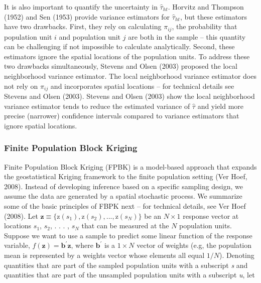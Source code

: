 \documentclass[]{elsarticle} %
\begin{document}
It is also important to quantify the uncertainty in \(\hat{\tau}_{ht}\).
Horvitz and Thompson (1952) and Sen (1953) provide variance estimators
for \(\hat{\tau}_{ht}\), but these estimators have two drawbacks. First,
they rely on calculating \(\pi_{ij}\), the probability that population
unit \(i\) and population unit \(j\) are both in the sample -- this
quantity can be challenging if not impossible to calculate analytically.
Second, these estimators ignore the spatial locations of the population
units. To address these two drawbacks simultaneously, Stevens and Olsen
(2003) proposed the local neighborhood variance estimator. The local
neighborhood variance estimator does not rely on \(\pi_{ij}\) and
incorporates spatial locations -- for technical details see Stevens and
Olsen (2003). Stevens and Olsen (2003) show the local neighborhood
variance estimator tends to reduce the estimated variance of
\(\hat{\tau}\) and yield more precise (narrower) confidence intervals
compared to variance estimators that ignore spatial locations.

\hypertarget{finite-population-block-kriging}{%
\subsubsection{Finite Population Block
Kriging}\label{finite-population-block-kriging}}

Finite Population Block Kriging (FPBK) is a model-based approach that
expands the geostatistical Kriging framework to the finite population
setting (Ver Hoef, 2008). Instead of developing inference based on a
specific sampling design, we assume the data are generated by a spatial
stochastic process. We summarize some of the basic principles of FBPK
next -- for technical details, see Ver Hoef (2008). Let
\({\mathbf{z} \equiv \{\text{z}(s_1), \text{z}(s_2), . . . , \text{z}(s_N) \}}\)
be an \(N \times 1\) response vector at locations \(s_1\), \(s_2\), . .
. , \(s_N\) that can be measured at the \(N\) population units. Suppose
we want to use a sample to predict some linear function of the response
variable, \(f(\mathbf{z}) = \mathbf{b}^\prime \mathbf{z}\), where
\(\mathbf{b}^\prime\) is a \(1 \times N\) vector of weights (e.g, the
population mean is represented by a weights vector whose elements all
equal \(1 / N\)). Denoting quantities that are part of the sampled
population units with a subscript \emph{s} and quantities that are part
of the unsampled population units with a subscript \emph{u}, let
\end{document}
